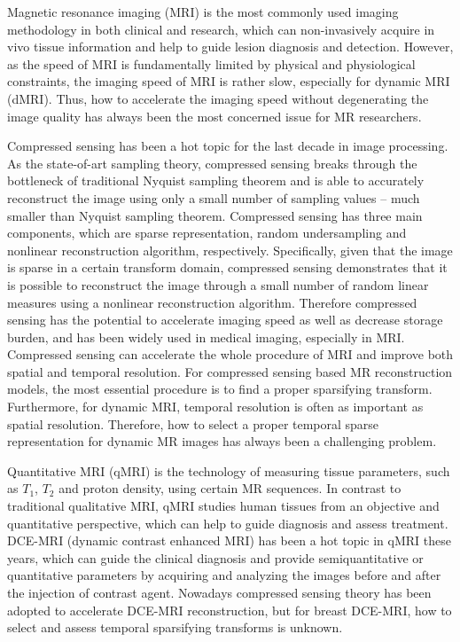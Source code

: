 \begin{englishabstract}
Magnetic resonance imaging (MRI) is the most commonly used imaging methodology in both clinical and research, which can non-invasively acquire in vivo tissue information and help to guide lesion diagnosis and detection. However, as the speed of MRI is fundamentally limited by physical and physiological constraints, the imaging speed of MRI is rather slow, especially for dynamic MRI (dMRI). Thus, how to accelerate the imaging speed without degenerating the image quality has always been the most concerned issue for MR researchers.

Compressed sensing has been a hot topic for the last decade in image processing. As the state-of-art sampling theory, compressed sensing breaks through the bottleneck of traditional Nyquist sampling theorem and is able to accurately reconstruct the image using only a small number of sampling values -- much smaller than Nyquist sampling theorem. Compressed sensing has three main components, which are sparse representation, random undersampling and nonlinear reconstruction algorithm, respectively. Specifically, given that the image is sparse in a certain transform domain, compressed sensing demonstrates that it is possible to reconstruct the image through a small number of random linear measures using a nonlinear reconstruction algorithm. Therefore compressed sensing has the potential to accelerate imaging speed as well as decrease storage burden, and has been widely used in medical imaging, especially in MRI. Compressed sensing can accelerate the whole procedure of MRI and improve both spatial and temporal resolution. For compressed sensing based MR reconstruction models, the most essential procedure is to find a proper sparsifying transform. Furthermore, for dynamic MRI, temporal resolution is often as important as spatial resolution. Therefore, how to select a proper temporal sparse representation for dynamic MR images has always been a challenging problem.

Quantitative MRI (qMRI) is the technology of measuring tissue parameters, such as $T_1$, $T_2$ and proton density, using certain MR sequences. In contrast to traditional qualitative MRI, qMRI studies human tissues from an objective and quantitative perspective, which can help to guide diagnosis and assess treatment. DCE-MRI (dynamic contrast enhanced MRI) has been a hot topic in qMRI these years, which can guide the clinical diagnosis and provide semiquantitative or quantitative parameters by acquiring and analyzing the images before and after the injection of contrast agent. Nowadays compressed sensing theory has been adopted to accelerate DCE-MRI reconstruction, but for breast DCE-MRI, how to select and assess temporal sparsifying transforms is unknown.


\end{englishabstract}
